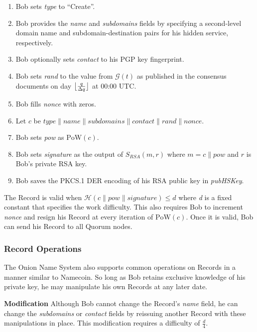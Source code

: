 \documentclass[conference]{IEEEtran}
\DeclarePairedDelimiter{\floor}{\lfloor}{\rfloor}
\newcommand*\concat{\mathbin{\|}}
\begin{document}
\begin{enumerate}
	\item Bob sets \emph{type} to ``Create''.
	\item Bob provides the \emph{name} and \emph{subdomains} fields by specifying a second-level domain name and subdomain-destination pairs for his hidden service, respectively.
	\item Bob optionally sets \emph{contact} to his PGP key fingerprint.
	\item Bob sets \emph{rand} to the value from $ \mathcal{G}(t) $ as published in the consensus documents on day $ \floor[\big]{\frac{q}{\Delta q}} $ at 00:00 UTC.
	\item Bob fills \emph{nonce} with zeros.
	\item Let $ \mathit{c} $ be $\mathit{type} \concat \mathit{name} \concat \mathit{subdomains} \concat \mathit{contact} \concat \mathit{rand} \concat \mathit{nonce} $.
	\item Bob sets \emph{pow} as $ \mathrm{PoW}(\mathit{c}) $.
	\item Bob sets \emph{signature} as the output of $ S_{\mathit{RSA}}(m, r) $ where $ m = \mathit{c} \concat \mathit{pow} $ and $ r $ is Bob's private RSA key.
	\item Bob saves the PKCS.1 DER encoding of his RSA public key in \emph{pubHSKey}.
\end{enumerate}

The Record is valid when $ \mathcal{H}(\mathit{c} \concat \mathit{pow} \concat \mathit{signature}) \leq d $ where \emph{d} is a fixed constant that specifies the work difficulty. This also requires Bob to increment \emph{nonce} and resign his Record at every iteration of $ \mathrm{PoW}(\mathit{c}) $. Once it is valid, Bob can send his Record to all Quorum nodes.

\subsubsection{Record Operations}

The Onion Name System also supports common operations on Records in a manner similar to Namecoin. So long as Bob retains exclusive knowledge of his private key, he may manipulate his own Records at any later date.

\textbf{Modification} Although Bob cannot change the Record's \emph{name} field, he can change the \emph{subdomains} or \emph{contact} fields by reissuing another Record with these manipulations in place. This modification requires a difficulty of $ \frac{d}{4} $.
\end{document}
